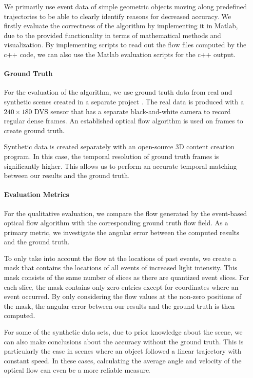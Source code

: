 We primarily use event data of simple geometric objects moving along predefined trajectories to be able to clearly identify reasons for decreased accuracy.
We firstly evaluate the correctness of the algorithm by implementing it in Matlab, due to the provided functionality in terms of mathematical methods and visualization.
By implementing scripts to read out the flow files computed by the c++ code, we can also use the Matlab evaluation scripts for the c++ output.
\paragraph{Ground Truth}
For the evaluation of the algorithm, we use ground truth data from real and synthetic scenes created in a separate project \cite{Scherer2015}.
The real data is produced with a $240\times180$ DVS sensor that has a separate black-and-white camera to record regular dense frames.
An established optical flow algorithm is used on frames to create ground truth.


Synthetic data is created separately with an open-source 3D content creation program. 
In this case, the temporal resolution of ground truth frames is significantly higher. %
This allows us to perform an accurate temporal matching between our results and the ground truth.

\paragraph{Evaluation Metrics}
For the qualitative evaluation, we compare the flow generated by the event-based optical flow algorithm with the corresponding ground truth flow field. As a primary metric, we investigate the angular error between the computed results and the ground truth. 

To only take into account the flow at the locations of past events, we create a mask that contains the locations of all events of increased light intensity.
This mask consists of the same number of slices as there are quantized event slices.
For each slice, the mask contains only zero-entries except for coordinates where an event occurred. 
By only considering the flow values at the non-zero positions of the mask, 
the angular error between our results and the ground truth is then computed.


For some of the synthetic data sets, due to prior knowledge about the scene, we can also make conclusions about the accuracy without the ground truth.
This is particularly the case in scenes where an object followed a linear trajectory with constant speed.
In these cases, calculating the average angle and velocity of the optical flow can even be a more reliable measure. 

